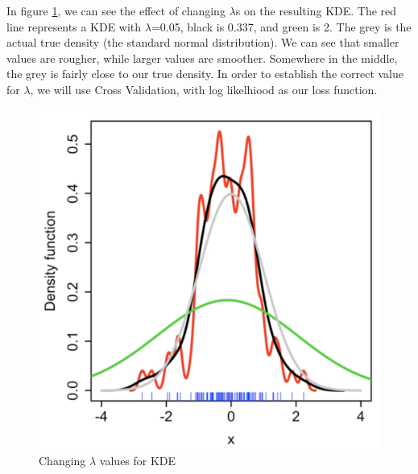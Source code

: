 \documentclass[a4paper]{article}
\begin{document}
In figure \ref{fig:kde_2}, we can see the effect of changing $\lambda$s on the resulting KDE. The red line represents a KDE with $\lambda$=0.05, black is 0.337, and green is 2. The grey is the actual true density (the standard normal distribution). We can see that smaller values are rougher, while larger values are smoother. Somewhere in the middle, the grey is fairly close to our true density. In order to establish the correct value for $\lambda$, we will use Cross Validation, with log likelhiood as our loss function.
\begin{figure}
\centering
\includegraphics[width=1.0\textwidth]{kde_2.png}
\caption{\label{fig:kde_2}Changing $\lambda$ values for KDE}
\end{figure}
\end{document}
